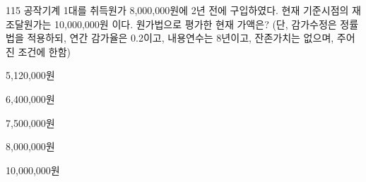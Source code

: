 \begin{question}{115}
공작기계 1대를 취득원가 8,000,000원에 2년 전에 구입하였다. 현재 기준시점의 재조달원가는 10,000,000원 이다. 원가법으로 평가한 현재 가액은? (단, 감가수정은 정률법을 적용하되, 연간 감가율은 0.2이고, 내용연수는 8년이고, 잔존가치는 없으며, 주어진 조건에 한함)
\begin{choices}
  \item 5,120,000원
  \item 6,400,000원
  \item 7,500,000원
  \item 8,000,000원
  \item 10,000,000원
\end{choices}
\end{question}
